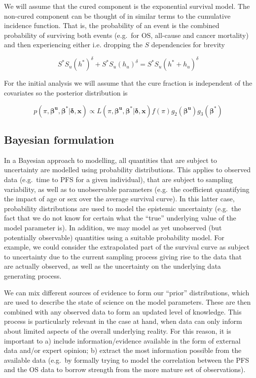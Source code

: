 \documentclass[
]{article}
\begin{document}
We will assume that the cured component is the exponential survival
model. The non-cured component can be thought of in similar terms to the
cumulative incidence function. That is, the probability of an event is
the combined probability of surviving both events (e.g.~for OS,
all-cause and cancer mortality) and then experiencing either i.e.
dropping the \(S\) dependencies for brevity

\begin{equation}
\tag{**}
S^* S_u (h^*)^{\delta} + S^* S_u (h_u)^{\delta} = S^* S_u (h^* + h_u)^{\delta}
\end{equation}

For the initial analysis we will assume that the cure fraction is
independent of the covariates so the posterior distribution is

\[
p(\pi, \boldsymbol{\beta^u}, \boldsymbol{\beta^*} | \boldsymbol{\delta}, \boldsymbol{x}) \propto L(\pi, \boldsymbol{\beta^u}, \boldsymbol{\beta^*} | \boldsymbol{\delta}, \boldsymbol{x}) f(\pi) g_2(\boldsymbol{\beta^u}) g_3(\boldsymbol{\beta^*})
\]

\hypertarget{bayesian-formulation}{%
\subsection{Bayesian formulation}\label{bayesian-formulation}}

In a Bayesian approach to modelling, all quantities that are subject to
uncertainty are modelled using probability distributions. This applies
to observed data (e.g.~time to PFS for a given individual), that are
subject to sampling variability, as well as to unobservable parameters
(e.g.~the coefficient quantifying the impact of age or sex over the
average survival curve). In this latter case, probability distributions
are used to model the epistemic uncertainty (e.g.~the fact that we do
not know for certain what the ``true'' underlying value of the model
parameter is). In addition, we may model as yet unobserved (but
potentially observable) quantities using a suitable probability model.
For example, we could consider the extrapolated part of the survival
curve as subject to uncertainty due to the current sampling process
giving rise to the data that are actually observed, as well as the
uncertainty on the underlying data generating process.

We can mix different sources of evidence to form our ``prior''
distributions, which are used to describe the state of science on the
model parameters. These are then combined with any observed data to form
an updated level of knowledge. This process is particularly relevant in
the case at hand, when data can only inform about limited aspects of the
overall underlying reality. For this reason, it is important to a)
include information/evidence available in the form of external data
and/or expert opinion; b) extract the most information possible from the
available data (e.g.~by formally trying to model the correlation between
the PFS and the OS data to borrow strength from the more mature set of
observations).
\end{document}
